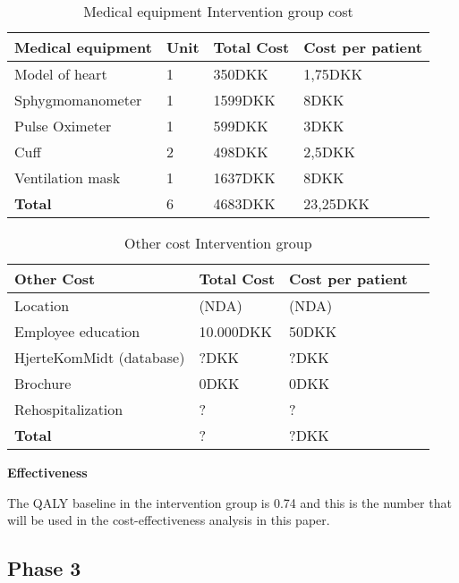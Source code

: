 \begin{table}[H]
\begin{longtabu} to 
    \textbf{Medical equipment} & \textbf{Unit} &\textbf{Total Cost} & \textbf{Cost per patient} \\[-1ex]
    \midrule
    Model of heart   &  1 &  350DKK & 1,75DKK \\ \hline
    Sphygmomanometer  & 1 & 1599DKK & 8DKK  \\ \hline
    Pulse Oximeter    &  1 & 599DKK &   3DKK \\ \hline 
    Cuff    &  2 & 498DKK  &   2,5DKK  \\ \hline 
    Ventilation mask   &  1 & 1637DKK  &   8DKK \\
    \hline \hline \hline
    \textbf{Total} & 6 & 4683DKK & 23,25DKK
    \newline
    \newline
   \end{longtabu}
\caption{Medical equipment Intervention group cost}
\label{tab: MeI}
\end{table}

\begin{table}[H]
\begin{longtabu} to 
    \textbf{Other Cost} &\textbf{Total Cost} & \textbf{Cost per patient} \\[-1ex]
    \midrule
    Location   &  (NDA) & (NDA) \\ \hline
    Employee education   & 10.000DKK & 50DKK  \\ \hline
    HjerteKomMidt (database)  & ?DKK &   ?DKK \\ \hline
    Brochure & 0DKK & 0DKK \\ \hline
    Rehospitalization & ? & ? \\
    \hline \hline \hline
    \textbf{Total} & ?  & ?DKK
    \newline
    \newline
   \end{longtabu}
\caption{Other cost Intervention group}
\label{tab: OI}
\end{table}

\textbf{Effectiveness}

The QALY baseline in the intervention group is 0.74 and this is the number that will be used in the cost-effectiveness analysis in this paper\cite{costeffect}. 

\subsection{Phase 3}


